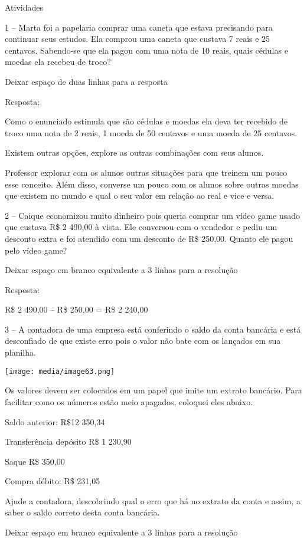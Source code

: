 Atividades

1 -- Marta foi a papelaria comprar uma caneta que estava precisando para
continuar seus estudos. Ela comprou uma caneta que custava 7 reais e 25
centavos. Sabendo-se que ela pagou com uma nota de 10 reais, quais
cédulas e moedas ela recebeu de troco?

Deixar espaço de duas linhas para a resposta

Resposta:

Como o enunciado estimula que são cédulas e moedas ela deva ter recebido
de troco uma nota de 2 reais, 1 moeda de 50 centavos e uma moeda de 25
centavos.

Existem outras opções, explore as outras combinações com seus alunos.

Professor explorar com os alunos outras situações para que treinem um
pouco esse conceito. Além disso, converse um pouco com os alunos sobre
outras moedas que existem no mundo e qual o seu valor em relação ao real
e vice e versa.

2 -- Caique economizou muito dinheiro pois queria comprar um vídeo game
usado que custava R\$ 2 490,00 à vista. Ele conversou com o vendedor e
pediu um desconto extra e foi atendido com um desconto de R\$ 250,00.
Quanto ele pagou pelo vídeo game?

Deixar espaço em branco equivalente a 3 linhas para a resolução

Resposta:

R\$ 2 490,00 -- R\$ 250,00 = R\$ 2 240,00

3 -- A contadora de uma empresa está conferindo o saldo da conta
bancária e está desconfiado de que existe erro pois o valor não bate com
os lançados em sua planilha.

\texttt{[image: media/image63.png]}

Os valores devem ser colocados em um papel que imite um extrato
bancário. Para facilitar como os números estão meio apagados, coloquei
eles abaixo.

Saldo anterior: R\$12 350,34

Transferência depósito R\$ 1 230,90

Saque R\$ 350,00

Compra débito: R\$ 231,05

Ajude a contadora, descobrindo qual o erro que há no extrato da conta e
assim, a saber o saldo correto desta conta bancária.

Deixar espaço em branco equivalente a 3 linhas para a resolução

